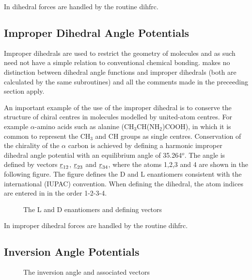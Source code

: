 In \D{} dihedral forces are handled by the routine {\sc dihfrc}.

\subsection{Improper Dihedral Angle Potentials}

Improper dihedrals are used to restrict the geometry of molecules and
as such need not have a simple relation to conventional chemical
bonding.  \D{} makes no distinction between dihedral angle
functions and improper dihedrals (both are calculated by the same
subroutines) and all the comments made in the preceeding section
apply.

An important example of the use of the improper
dihedral is to
conserve the structure of chiral centres in molecules modelled by
united-atom centres. For example $\alpha$-amino acids such as alanine
(CH$_{3}$CH(NH$_{2}$)COOH), in which it is common to represent the
CH$_{3}$ and CH groups as single centres. Conservation of the
chirality of the $\alpha$ carbon is achieved by defining a harmonic
improper dihedral angle potential with an equilibrium angle of
35.264$^{o}$.  The angle is defined by vectors $\mbox{$\underline{r}$}_{12}$,
$\mbox{$\underline{r}$}_{23}$ and $\mbox{$\underline{r}$}_{34}$, where the atoms 1,2,3 and 4 are
shown in the following figure. The figure defines the D and L
enantiomers consistent with the international (IUPAC) convention. When
defining the dihedral, the atom indices are entered in \D{}
in the order 1-2-3-4.

\begin{figure}[ht]
\begin{center}
\centerline{}
\caption{The L and D enantiomers and defining vectors}
\end{center}
\end{figure}

In \D{} improper dihedral forces are handled by the routine
{\sc dihfrc}.

\subsection{Inversion Angle Potentials}

\begin{figure}[ht]
\begin{center}
\centerline{}
\caption{The inversion angle and associated vectors}
\end{center}
\end{figure}

